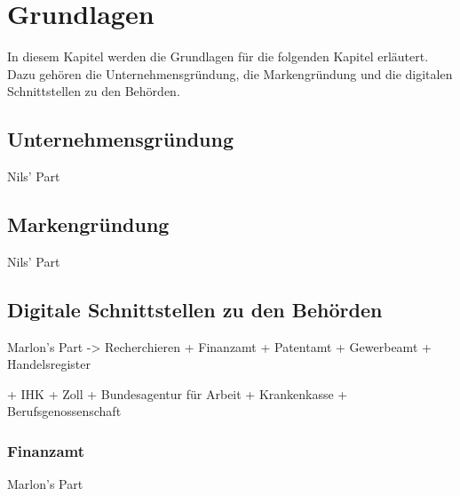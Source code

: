 \newpage

\section{Grundlagen} \label{grundlagen}
In diesem Kapitel werden die Grundlagen für die folgenden Kapitel erläutert. Dazu gehören die Unternehmensgründung, die Markengründung und die digitalen Schnittstellen zu den Behörden.


\subsection{Unternehmensgründung} \label{unternehmensgründung}

Nils' Part

\subsection{Markengründung} \label{markengründung}

Nils' Part

\subsection{Digitale Schnittstellen zu den Behörden} \label{digitaleBehoerden}

Marlon's Part
-> Recherchieren
+ Finanzamt
+ Patentamt
+ Gewerbeamt
+ Handelsregister

+ IHK
+ Zoll
+ Bundesagentur für Arbeit
+ Krankenkasse
+ Berufsgenossenschaft

\subsubsection{Finanzamt} \label{finanzamt}

Marlon's Part
